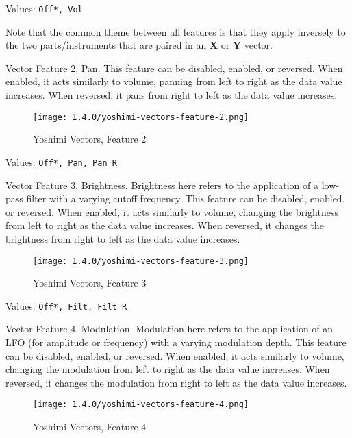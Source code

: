    Values: \texttt{Off*, Vol}

   Note that the common theme between all features is that they apply inversely
   to the two parts/instruments that are paired in an \textbf{X}
   or \textbf{Y} vector.

   Vector Feature 2, Pan.
   This feature can be disabled, enabled, or reversed.
   When enabled, it acts similarly to volume, panning from left to right as the
   data value increases.
   When reversed, it pans from right to left as the data value increases.

\begin{figure}[H]
   \centering
   \texttt{[image: 1.4.0/yoshimi-vectors-feature-2.png]}
   \caption{Yoshimi Vectors, Feature 2}
   \label{fig:yoshimi_vectors_feature_2}
\end{figure}

   Values: \texttt{Off*, Pan, Pan R}

   Vector Feature 3, Brightness.
   Brightness here refers to the application of a low-pass filter
   with a varying cutoff frequency.
   This feature can be disabled, enabled, or reversed.
   When enabled, it acts similarly to volume, changing the brightness
   from left to right as the data value increases.
   When reversed, it changes the brightness from right to left as the data
   value increases.

\begin{figure}[H]
   \centering
   \texttt{[image: 1.4.0/yoshimi-vectors-feature-3.png]}
   \caption{Yoshimi Vectors, Feature 3}
   \label{fig:yoshimi_vectors_feature_3}
\end{figure}

   Values: \texttt{Off*, Filt, Filt R}

   Vector Feature 4, Modulation.
   Modulation here refers to the application of an LFO
   (for amplitude or frequency) with a varying modulation depth.
   This feature can be disabled, enabled, or reversed.
   When enabled, it acts similarly to volume, changing the modulation
   from left to right as the data value increases.
   When reversed, it changes the modulation from right to left as the data
   value increases.

\begin{figure}[H]
   \centering
   \texttt{[image: 1.4.0/yoshimi-vectors-feature-4.png]}
   \caption{Yoshimi Vectors, Feature 4}
   \label{fig:yoshimi_vectors_feature_4}
\end{figure}


